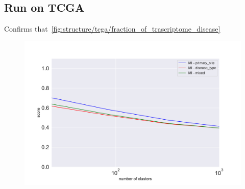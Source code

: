 \subsection{Run on TCGA}
Confirms that~\ref{fig:structure/tcga/fraction_of_trascriptome_disease}

\begin{figure}[htb!]
    \centering
    \includegraphics[width=0.8\linewidth]{pictures/topic/tcga/metric.pdf}
    \caption{}
    \label{fig:topic/tcga/metric}
\end{figure}

